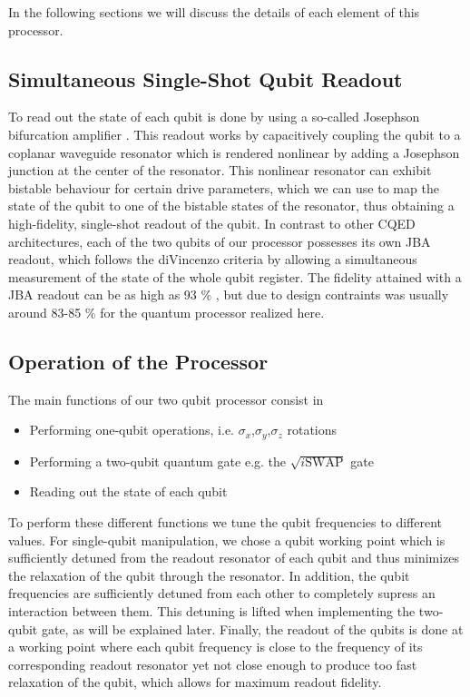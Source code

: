 In the following sections we will discuss the details of each element of this processor.

\subsection{Simultaneous Single-Shot Qubit Readout}

To read out the state of each qubit is done by using a so-called Josephson bifurcation amplifier \citep{siddiqi_dispersive_2006,mallet_single-shot_2009}. This readout works by capacitively coupling the qubit to a coplanar waveguide resonator which is rendered nonlinear by adding a Josephson junction at the center of the resonator. This nonlinear resonator can exhibit bistable behaviour for certain drive parameters, which we can use to map the state of the qubit to one of the bistable states of the resonator, thus obtaining a high-fidelity, single-shot readout of the qubit. In contrast to other CQED architectures, each of the two qubits of our processor possesses its own JBA readout, which follows the diVincenzo criteria by allowing a simultaneous measurement of the state of the whole qubit register. The fidelity attained with a JBA readout can be as high as 93 \% \citep{mallet_single-shot_2009}, but due to design contraints was usually around 83-85 \% for the quantum processor realized here.

\subsection{Operation of the Processor}

The main functions of our two qubit processor consist in 

\begin{itemize}
\item Performing one-qubit operations, i.e. $\sigma_x$,$\sigma_y$,$\sigma_z$ rotations
\item Performing a two-qubit quantum gate e.g. the $\sqrt{i\mathrm{SWAP}}$ gate
\item Reading out the state of each qubit
\end{itemize}

To perform these different functions we tune the qubit frequencies to different values. For single-qubit manipulation, we chose a qubit working point which is sufficiently detuned from the readout resonator of each qubit and thus minimizes the relaxation of the qubit through the resonator. In addition, the qubit frequencies are sufficiently detuned from each other to completely supress an interaction between them. This detuning is lifted when implementing the two-qubit gate, as will be explained later. Finally, the readout of the qubits is done at a working point where each qubit frequency is close to the frequency of its corresponding readout resonator yet not close enough to produce too fast relaxation of the qubit, which allows for maximum readout fidelity.

